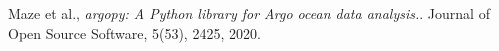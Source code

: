 \documentclass[12pt]{article}
\begin{document}
\begin{thebibliography}{9}
    Maze et al.,
    \textit{argopy: A Python library for Argo ocean data analysis.}. 
    Journal of Open Source Software, 5(53), 2425, 2020.
\end{thebibliography}
\end{document}
